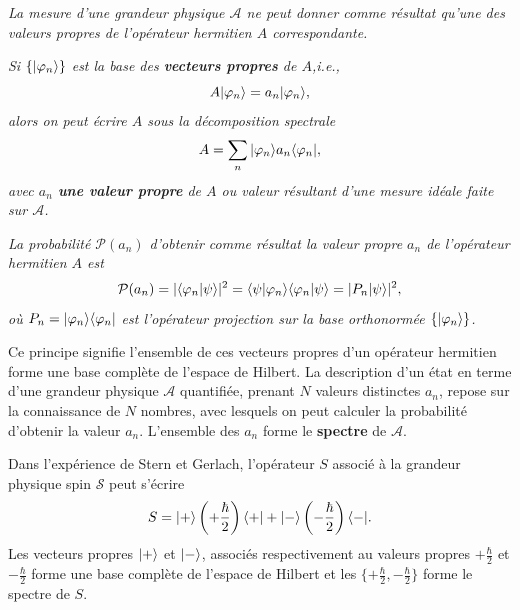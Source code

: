 \medskip
\colorbox[gray]{0.8}{
\parbox[c]{0.9\textwidth}{
\emph{La mesure d'une grandeur physique $\mathcal{A}$ ne peut donner comme
résultat qu'une des valeurs propres de l'opérateur hermitien $A$
correspondante.}

\emph{Si $\{\vert\varphi_n\rangle\}$ est la base des \textbf{vecteurs propres} de
$A$,i.e.,}%
\begin{equation}
A\vert\varphi_n\rangle =a_n\vert\varphi_n\rangle,
\end{equation}
\emph{alors on peut écrire $A$ sous la décomposition spectrale}%
\begin{equation}
A=\sum_n\vert\varphi_n\rangle a_n\langle\varphi_n\vert,
\end{equation}
\emph{avec $a_n$ \textbf{une valeur propre} de $A$ ou valeur résultant d'une
mesure idéale faite sur $\mathcal{A}$.}
}}\medskip

\medskip
\colorbox[gray]{0.8}{
\parbox[c]{0.9\textwidth}{
\emph{La probabilité $\mathcal{P}(a_n)$ d'obtenir comme
résultat la valeur propre $a_n$ de l'opérateur hermitien $A$ est}%
\begin{equation}
\mathcal{P}(a_n)=|\langle\varphi_n\ket{\psi}|^{2}=\langle\psi\ket{\varphi_{n
}} \langle\varphi_n\ket{\psi}=|P_n\ket{\psi}|^{2},
\label{eq:Postu4}%
\end{equation}
\emph{où $P_n=\vert\varphi_n\rangle\langle\varphi_n\vert$ est l'opérateur projection
sur la base orthonormée $\{\vert\varphi_n\rangle\}$.}
}}
\medskip

Ce principe signifie l'ensemble de ces vecteurs propres d'un opérateur hermitien
forme une base complète de l'espace de Hilbert. La description d'un état en
terme d'une grandeur physique $\mathcal{A}$ quantifiée, prenant $N$ valeurs
distinctes $a_n$, repose sur la connaissance de $N$ nombres, avec lesquels on
peut calculer la probabilité d'obtenir la valeur $a_n$. L'ensemble des $a_n$
forme le \textbf{spectre} de $\mathcal{A}$.

Dans l'expérience de Stern et Gerlach, l'opérateur $S$ associé à la grandeur
physique spin $\mathcal{S}$ peut s'écrire%
\begin{equation}
S=\vert+\rangle\left(+\frac{\hbar}{2}\right)\langle+\vert+\vert-\rangle\left(-\frac{\hbar}{2}
\right)\langle-\vert.
\end{equation}
Les vecteurs propres $\vert+\rangle$ et $\vert-\rangle$, associés respectivement au valeurs
propres $+\frac{\hbar}{2}$ et $-\frac{\hbar}{2}$ forme une base complète de
l'espace de Hilbert et les $\{+\frac{\hbar}{2},-\frac{\hbar}{2}\}$ forme le
spectre de $S$.

